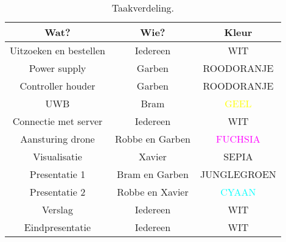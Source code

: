 \begin{table}[p]
	\centering
	\begin{tabular}{ |c|c|c| } \hline
		Wat? & Wie? & Kleur \\ [.5ex] \hline\hline
		Uitzoeken en bestellen & Iedereen & WIT \\ \hline
		Power supply & Garben & \textcolor{RedOrange}{ROODORANJE} \\ \hline
		Controller houder & Garben & \textcolor{RedOrange}{ROODORANJE} \\ \hline
		UWB & Bram & \textcolor{Yellow}{GEEL} \\ \hline
		Connectie met server & Iedereen & WIT \\ \hline
		Aansturing drone & Robbe en Garben & \textcolor{Fuchsia}{FUCHSIA} \\ \hline
		Visualisatie & Xavier & \textcolor{Sepia}{SEPIA} \\ \hline
		Presentatie 1 & Bram en Garben & \textcolor{JungleGreen}{JUNGLEGROEN} \\ \hline
		Presentatie 2 & Robbe en Xavier & \textcolor{Cyan}{CYAAN} \\ \hline
		Verslag & Iedereen & WIT \\ \hline
		Eindpresentatie & Iedereen & WIT \\ \hline
	\end{tabular}
	\caption[Taakverdeling]{Taakverdeling.}
	\label{tab:taakverdeling}
\end{table}